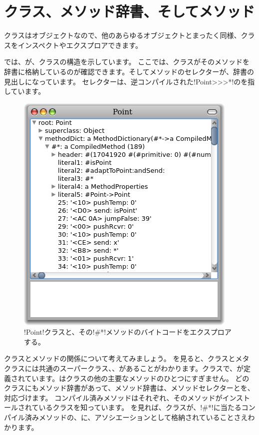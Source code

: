 \documentclass[a4paper,10pt,twoside]{book}
\begin{document}
\section{クラス、メソッド辞書、そしてメソッド}

クラスはオブジェクトなので、他のあらゆるオブジェクトとまったく同様、クラスをインスペクトやエクスプロアできます。


では、が、クラスの構造を示しています。
ここでは、クラスがそのメソッドを辞書に格納しているのが確認できます。そしてメソッドのセレクターが、辞書の見出しになっています。
セレクター\ct{#*}は、逆コンパイルされた\ct!Point>>>*!のを指しています。

\begin{figure}[ht]\centering
	\includegraphics[width=.5\linewidth]{CompiledMethod}
	\caption{\ct!Point!クラスと、その\ct!\#*!メソッドのバイトコードをエクスプロアする。}
\end{figure}

クラスとメソッドの関係について考えてみましょう。
を見ると、クラスとメタクラスには共通のスーパークラス、、があることがわかります。クラスで、が定義されています。はクラスの他の主要なメソッドのひとつにすぎません。
どのクラスにもメソッド辞書があって、メソッド辞書は、メソッドセレクターとを、対応づけます。
コンパイル済みメソッドはそれぞれ、そのメソッドがインストールされているクラスを知っています。
を見れば、クラスが、\ct!#*!に当たるコンパイル済みメソッドの、に、アソシエーションとして格納されていることさえわかります。
\end{document}
